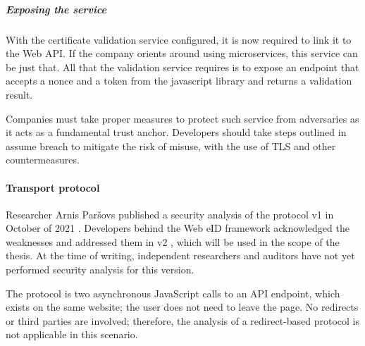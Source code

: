 \subparagraph{Exposing the service}

With the certificate validation service configured, it is now required to link it to the Web API. If the company orients around using microservices, this service can be just that. All that the validation service requires is to expose an endpoint that accepts a nonce and a token from the javascript library and returns a validation result.

Companies must take proper measures to protect such service from adversaries as it acts as a fundamental trust anchor. Developers should take steps outlined in assume breach  to mitigate the risk of misuse, with the use of TLS and other countermeasures.

\paragraph{Transport protocol}

Researcher Arnis Paršovs published a security analysis of the protocol v1 in October of 2021 \cite{arnis-report-webeid}. Developers behind the Web eID framework acknowledged the weaknesses and addressed them in v2 \cite{ria-webeid-systemarchitecture}, which will be used in the scope of the thesis. At the time of writing, independent researchers and auditors have not yet performed security analysis for this version.

The protocol is two asynchronous JavaScript calls to an API endpoint, which exists on the same website; the user does not need to leave the page. No redirects or third parties are involved; therefore, the analysis of a redirect-based protocol is not applicable in this scenario.


